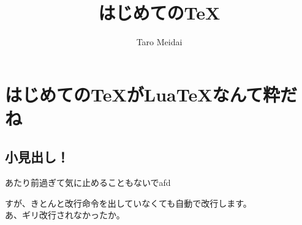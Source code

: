 \documentclass{ltjsarticle}
\begin{document}
\title{はじめての\TeX }
\author{Taro Meidai}
\maketitle
\section{はじめての\TeX がLua\TeX なんて粋だね}

\subsection{小見出し！}
あたり前過ぎて気に止めることもないでafd

すが、きとんと改行命令を出していなくても自動で改行します。
\\あ、ギリ改行されなかったか。
\end{document}
